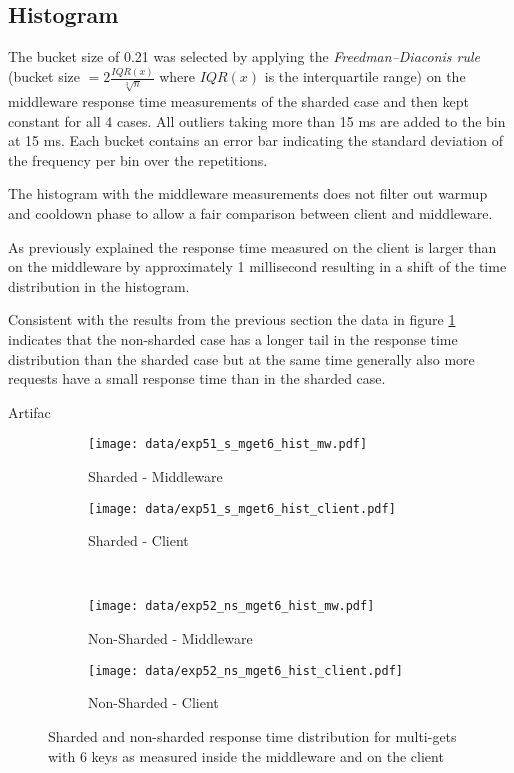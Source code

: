 \documentclass[report.tex]{subfiles}
\begin{document}
\subsection{Histogram}

The bucket size of 0.21 was selected by applying the \emph{Freedman–Diaconis rule} (bucket size $ = 2 \frac{IQR(x)}{\sqrt[3]{n}}$ where $IQR(x)$ is the interquartile range) on the middleware response time measurements of the sharded case and then kept constant for all 4 cases. All outliers taking more than 15 ms are added to the bin at 15 ms. Each bucket contains an error bar indicating the standard deviation of the frequency per bin over the repetitions.

The histogram with the middleware measurements does not filter out warmup and cooldown phase to allow a fair comparison between client and middleware. 

As previously explained the response time measured on the client is larger than on the middleware by approximately 1 millisecond resulting in a shift of the time distribution in the histogram.

Consistent with the results from the previous section the data in figure \ref{exp5_hist} indicates that the non-sharded case has a longer tail in the response time distribution than the sharded case but at the same time generally also more requests have a small response time than in the sharded case.

Artifac

\begin{figure}
	\begin{subfigure}[b]{.49\linewidth}
		\centering
		\texttt{[image: data/exp51\_s\_mget6\_hist\_mw.pdf]}
		\caption{Sharded - Middleware}
	\end{subfigure}\hfill
	\begin{subfigure}[b]{.49\linewidth}
		\centering
		\texttt{[image: data/exp51\_s\_mget6\_hist\_client.pdf]}
		\caption{Sharded - Client}
	\end{subfigure} \\
	\begin{subfigure}[b]{.49\linewidth}
		\centering
		\texttt{[image: data/exp52\_ns\_mget6\_hist\_mw.pdf]}
		\caption{Non-Sharded - Middleware}
	\end{subfigure}\hfill
	\begin{subfigure}[b]{.49\linewidth}
		\centering
		\texttt{[image: data/exp52\_ns\_mget6\_hist\_client.pdf]}
		\caption{Non-Sharded - Client}
	\end{subfigure}%
	\caption{Sharded and non-sharded response time distribution for multi-gets with 6 keys as measured inside the middleware and on the client}\label{exp5_hist}
\end{figure}
\end{document}
